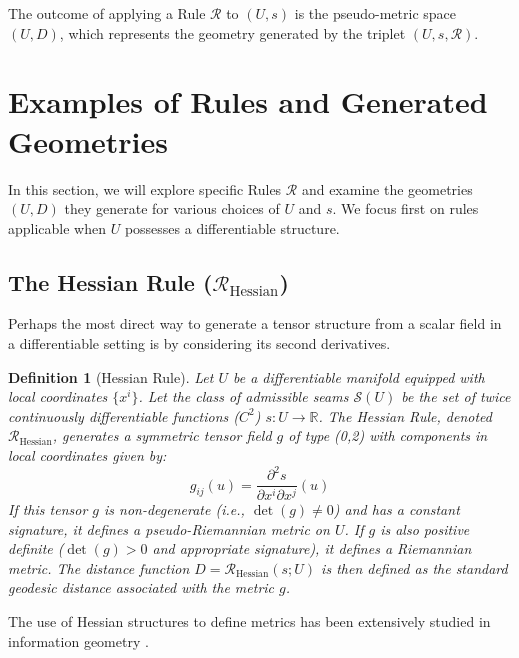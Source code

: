 \documentclass[twoside,twocolumn]{article}
\newtheorem{definition}{Definition}[subsection]
\numberwithin{equation}{section} %
\begin{document}
The outcome of applying a Rule $\mathcal{R}$ to $(U, s)$ is the pseudo-metric space $(U, D)$, which represents the geometry generated by the triplet $(U, s, \mathcal{R})$.


\setcounter{equation}{0}
\section{Examples of Rules and Generated Geometries}

In this section, we will explore specific Rules $\mathcal{R}$ and examine the geometries $(U, D)$ they generate for various choices of $U$ and $s$. We focus first on rules applicable when $U$ possesses a differentiable structure.

\subsection{The Hessian Rule ($\mathcal{R}_{\text{Hessian}}$)}
\setcounter{definition}{0}

Perhaps the most direct way to generate a tensor structure from a scalar field in a differentiable setting is by considering its second derivatives.

\begin{definition}[Hessian Rule]
Let $U$ be a differentiable manifold equipped with local coordinates $\{x^i\}$. Let the class of admissible seams $\mathcal{S}(U)$ be the set of twice continuously differentiable functions ($C^2$) $s: U \to \mathbb{R}$. The \emph{Hessian Rule}, denoted $\mathcal{R}_{\text{Hessian}}$, generates a symmetric tensor field $g$ of type (0,2) with components in local coordinates given by:
\begin{equation}
g_{ij}(u) = \frac{\partial^2 s}{\partial x^i \partial x^j}(u)
\label{eq:hessian_rule}
\end{equation}
If this tensor $g$ is non-degenerate (i.e., $\det(g) \neq 0$) and has a constant signature, it defines a pseudo-Riemannian metric on $U$. If $g$ is also positive definite ($\det(g) > 0$ and appropriate signature), it defines a Riemannian metric. The distance function $D = \mathcal{R}_{\text{Hessian}}(s; U)$ is then defined as the standard geodesic distance associated with the metric $g$.
\end{definition}
The use of Hessian structures to define metrics has been extensively studied in information geometry \cite{Amari2016,Shima2007}.
\end{document}
